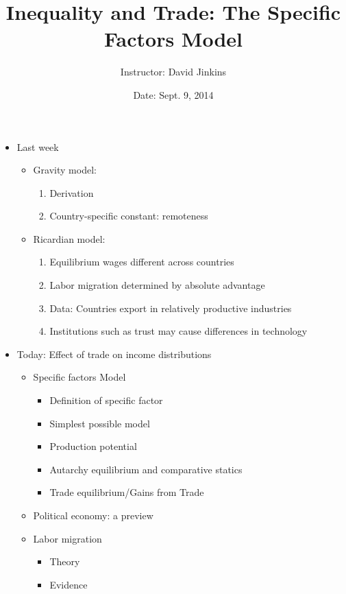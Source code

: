 \documentclass[ignorenonframetext,]{beamer}
\title{Inequality and Trade: The Specific Factors Model}
\author{Instructor: David Jinkins}
\date{Date: Sept. 9, 2014}
\begin{document}
\frame{\titlepage}

\begin{frame}
\begin{itemize}
\itemsep1pt\parskip0pt
\item
  Last week

  \begin{itemize}
  \itemsep1pt\parskip0pt
  \item Gravity model:
      \begin{enumerate}
          \item Derivation
          \item Country-specific constant: remoteness
      \end{enumerate}
  \item Ricardian model:
      \begin{enumerate}
          \item Equilibrium wages different across countries
          \item Labor migration determined by absolute advantage
          \item Data: Countries export in relatively productive industries 
          \item Institutions such as trust may cause differences in technology
      \end{enumerate}
  \end{itemize}
\end{itemize}

\end{frame}

\begin{frame}
\begin{itemize}
\itemsep1pt\parskip0pt
\item
  Today: Effect of trade on income distributions
  \begin{itemize}
        \item Specific factors Model
        \begin{itemize}
            \item Definition of specific factor
            \item Simplest possible model
            \item Production potential
            \item Autarchy equilibrium and comparative statics
            \item Trade equilibrium/Gains from Trade
        \end{itemize}
        \item Political economy: a preview
        \item Labor migration
        \begin{itemize}
            \item Theory
            \item Evidence
        \end{itemize}
    \end{itemize}
\end{itemize}

\end{frame}
\end{document}
